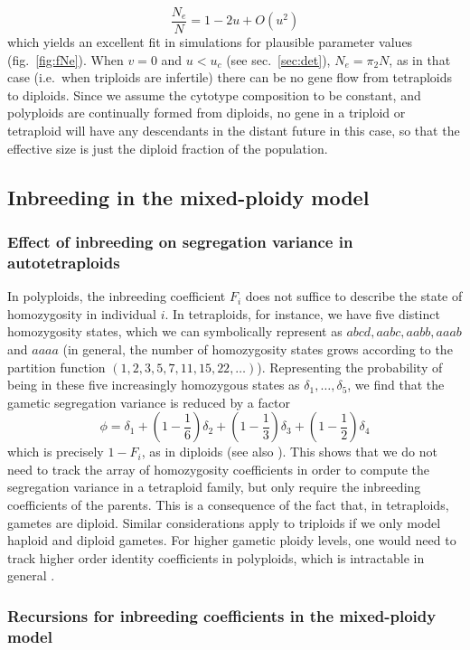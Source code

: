 \documentclass[11pt,a4paper]{article}
\begin{document}
\[\frac{N_e}{N} = 1 - 2u + O(u^2)\] which yields an excellent fit in
simulations for plausible parameter values (fig.~\ref{fig:fNe}). When
\(v=0\) and \(u < u_c\) (see sec.~\ref{sec:det}), \(N_e = \pi_2N\), as
in that case (i.e.~when triploids are infertile) there can be no gene
flow from tetraploids to diploids. Since we assume the cytotype
composition to be constant, and polyploids are continually formed from
diploids, no gene in a triploid or tetraploid will have any descendants
in the distant future in this case, so that the effective size is just
the diploid fraction of the population.


\subsection{Inbreeding in the mixed-ploidy model}

\subsubsection{Effect of inbreeding on segregation variance in autotetraploids \label{sec:tetinbred}}

In polyploids, the inbreeding coefficient $F_i$ does not suffice to describe
the state of homozygosity in individual $i$.
In tetraploids, for instance, we have five distinct homozygosity states, which
we can symbolically represent as $abcd, aabc, aabb, aaab$ and $aaaa$ (in
general, the number of homozygosity states grows according to the partition
function $(1,2,3,5,7,11,15,22,\dots)$).
Representing the probability of being in these five increasingly homozygous
states as $\delta_1, \dots, \delta_5$, we find that the gametic segregation
variance is reduced by a factor
  $$\phi = \delta_1 + \left(1 - \frac1 6\right) \delta_2 + \left(1 - \frac1
        3\right)\delta_3 + \left(1 - \frac1 2\right) \delta_4$$
which is precisely $1-F_i$, as in diploids (see also \cite{moody1993}).
This shows that we do not need to track the array of homozygosity coefficients
in order to compute the segregation variance in a tetraploid family, but only
require the inbreeding coefficients of the parents.
This is a consequence of the fact that, in tetraploids, gametes are diploid.
Similar considerations apply to triploids if we only model haploid and diploid
gametes.
For higher gametic ploidy levels, one would need to track higher order identity
coefficients in polyploids, which is intractable in general \citep{barton2023}.

\subsubsection{Recursions for inbreeding coefficients in the mixed-ploidy model}
\end{document}
